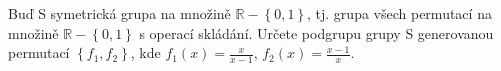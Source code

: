 \subsubsection{}
Buď S symetrická grupa na množině $\mathbb{R}-\left \{ 0,1 \right \}$, tj. grupa
všech permutací na množině $\mathbb{R}-\left \{ 0,1 \right \}$ s operací
skládání. Určete podgrupu grupy S generovanou permutací $\left \{ f_{1},f_{2}
\right \}$, kde $f_{1}(x)=\frac{x}{x-1}$, $f_{2}(x)=\frac{x-1}{x}$.

